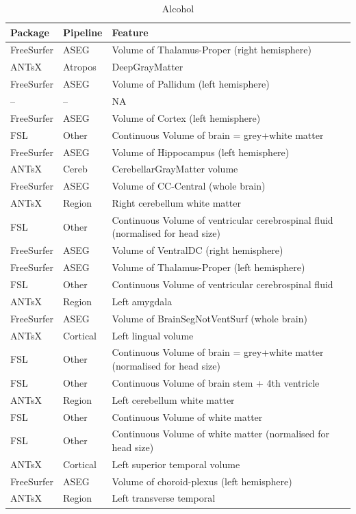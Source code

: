 \documentclass[
  10pt,
]{article}
\begin{document}
\begin{table}

\caption{\label{tab:compare-predictions}Alcohol}
\centering
\begin{tabular}[t]{lll}
\toprule
Package & Pipeline & Feature\\
\midrule
FreeSurfer & ASEG & Volume of Thalamus-Proper (right hemisphere)\\
ANTsX & Atropos & DeepGrayMatter\\
FreeSurfer & ASEG & Volume of Pallidum (left hemisphere)\\
-- & -- & NA\\
FreeSurfer & ASEG & Volume of Cortex (left hemisphere)\\
\addlinespace
FSL & Other & Continuous    Volume of brain = grey+white matter\\
FreeSurfer & ASEG & Volume of Hippocampus (left hemisphere)\\
ANTsX & Cereb & CerebellarGrayMatter volume\\
FreeSurfer & ASEG & Volume of CC-Central (whole brain)\\
ANTsX & Region & Right cerebellum white matter\\
\addlinespace
FSL & Other & Continuous    Volume of ventricular cerebrospinal fluid (normalised for head size)\\
FreeSurfer & ASEG & Volume of VentralDC (right hemisphere)\\
FreeSurfer & ASEG & Volume of Thalamus-Proper (left hemisphere)\\
FSL & Other & Continuous    Volume of ventricular cerebrospinal fluid\\
ANTsX & Region & Left amygdala\\
\addlinespace
FreeSurfer & ASEG & Volume of BrainSegNotVentSurf (whole brain)\\
ANTsX & Cortical & Left lingual volume\\
FSL & Other & Continuous    Volume of brain = grey+white matter (normalised for head size)\\
FSL & Other & Continuous    Volume of brain stem + 4th ventricle\\
ANTsX & Region & Left cerebellum white matter\\
\addlinespace
FSL & Other & Continuous    Volume of white matter\\
FSL & Other & Continuous    Volume of white matter (normalised for head size)\\
ANTsX & Cortical & Left superior temporal volume\\
FreeSurfer & ASEG & Volume of choroid-plexus (left hemisphere)\\
ANTsX & Region & Left transverse temporal\\
\bottomrule
\end{tabular}
\end{table}
\end{document}
